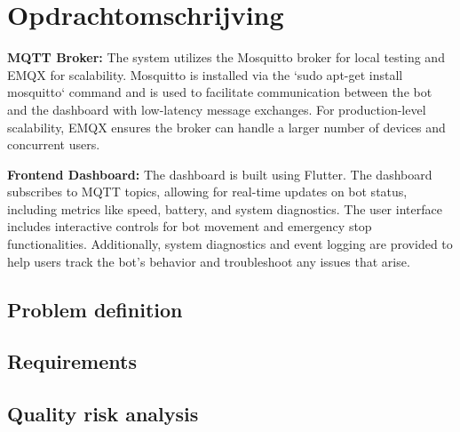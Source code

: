 
\section{Opdrachtomschrijving}
\textbf{MQTT Broker:} The system utilizes the Mosquitto broker for local testing and EMQX for scalability. 
Mosquitto is installed via the `sudo apt-get install mosquitto` command and is used to facilitate communication 
between the bot and the dashboard with low-latency message exchanges. For production-level scalability, EMQX 
ensures the broker can handle a larger number of devices and concurrent users. 

\textbf{Frontend Dashboard:} The dashboard is built using Flutter. 
The dashboard subscribes to MQTT topics, allowing for real-time updates on bot status, including metrics 
like speed, battery, and system diagnostics. The user interface includes interactive controls for bot movement and emergency 
stop functionalities. Additionally, system diagnostics and event logging are provided to help users track the bot's behavior 
and troubleshoot any issues that arise.

\subsection{Problem definition}

\subsection{Requirements}

\subsection{Quality risk analysis}

